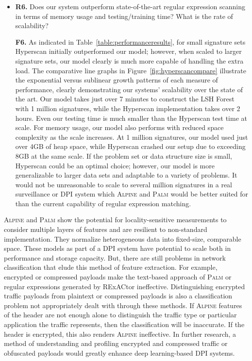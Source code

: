 \begin{itemize}
\item\textbf{R6.} Does our system outperform state-of-the-art regular expression scanning in terms of memory usage and testing/training time? What is the rate of scalability?

\textbf{F6.} As indicated in Table~\ref{table:performanceresults}, for small signature sets Hyperscan initially outperformed our model; however, when scaled to larger signature sets, our model clearly is much more capable of handling the extra load. The comparative line graphs in Figure~\ref{fig:hyperscancompare} illustrate the exponential versus sublinear growth patterns of each measure of performance, clearly demonstrating our systems' scalability over the state of the art. Our model takes just over 7 minutes to construct the LSH Forest with 1 million signatures, while the Hyperscan implementation takes over 2 hours. Even our testing time is much smaller than the Hyperscan test time at scale. For memory usage, our model also performs with reduced space complexity as the scale increases. At 1 million signatures, our model used just over 4GB of heap space, while Hyperscan crashed our setup due to exceeding 8GB at the same scale. If the problem set or data structure size is small, Hyperscan could be an optimal choice; however, our model is more generalizable to larger data sets and adaptable to a variety of problems. It would not be unreasonable to scale to several million signatures in a real surveillance or DPI system which \textsc{Alpine} and \textsc{Palm} would be better suited for than the current capability of regular expression matching.
\end{itemize}

\textsc{Alpine} and \textsc{Palm} show the potential for locality-sensitive measurements to consider multiple layers of features and are resilient to non-standard implementation. They normalize heterogeneous data into fixed-size, comparable space. These models as part of a DPI system have potential to scale both in performance and storage capacity. But, there are still problems in network classification that elude this method of feature extraction. For example, encrypted or compressed payloads make the text-based approach of \textsc{Palm} or regular expressions generated by RExACtor ineffective. Distinguishing encrypted traffic payloads from plaintext or compressed payloads is also a classification problem not appropriately dealt with through these methods. If \textsc{Alpine} features of the header are not enough alone to distinguish the traffic type or particular application the traffic represents, then the classification will be inaccurate. If the header is encrypted, this also renders \textsc{Alpine} ineffective. In further research, a method of understanding and profiling encrypted and compressed traffic or obfuscated payloads would greatly enhance deep learning-based DPI systems.
